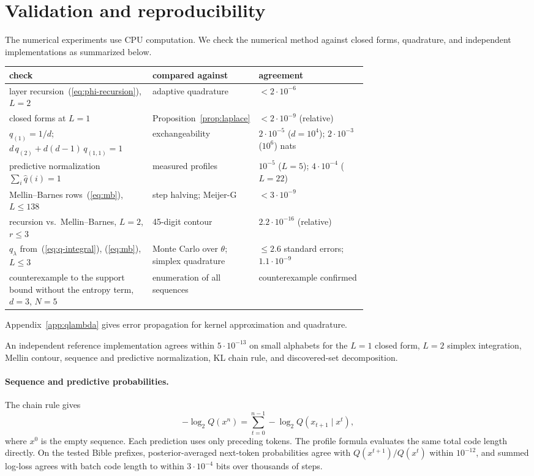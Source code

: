 \documentclass[anon]{alt2027}
\renewcommand{\eqref}[1]{(\ref{#1})}
\begin{document}
\FloatBarrier
{}
\section{Validation and reproducibility}
\label{app:validation}
The numerical experiments use CPU computation. We check the numerical method against closed forms, quadrature, and independent implementations as summarized below.
\begingroup
\renewcommand{\theHtable}{validation}
\footnotesize\setlength{\tabcolsep}{2pt} \begin{longtable}{@{}p{0.40\linewidth}p{0.28\linewidth}p{}@{}}
\toprule
check & compared against & agreement \\
\midrule
\endhead
layer recursion~\eqref{eq:phi-recursion}, $L=2$ & adaptive quadrature & $<2\cdot10^{-6}$ \\
closed forms at $L=1$ & Proposition~\ref{prop:laplace} & $<2\cdot10^{-9}$ (relative) \\
$q_{(1)}=1/d$; $d\,q_{(2)}+d(d-1)\,q_{(1,1)}=1$ & exchangeability & $2\cdot10^{-5}$ ($d{=}10^4$); $2\cdot10^{-3}$ ($10^6$) nats \\
predictive normalization $\sum_i\hat q(i)=1$ & measured profiles & $10^{-5}$ ($L=5$); $4\cdot10^{-4}$ ($L=22$) \\
Mellin--Barnes rows~\eqref{eq:mb}, $L\le138$ & step halving; Meijer-G & $<3\cdot10^{-9}$ \\
recursion vs.\ Mellin--Barnes, $L=2$, $r\le3$ & 45-digit contour & $2.2\cdot10^{-16}$ (relative) \\
$q_\lambda$ from~\eqref{eq:q-integral}, \eqref{eq:mb}, $L\le3$ & Monte Carlo over $\theta$; simplex quadrature & $\le2.6$ standard errors; $1.1\cdot10^{-9}$ \\
counterexample to the support bound without the entropy term, $d=3$, $N=5$ & enumeration of all sequences & counterexample confirmed \\
\bottomrule
\end{longtable}
\addtocounter{table}{-1}
\endgroup
Appendix~\ref{app:qlambda} gives error propagation for kernel approximation and quadrature.

An independent reference implementation agrees within $5\cdot10^{-13}$ on small alphabets for the $L=1$ closed form, $L=2$ simplex integration, Mellin contour, sequence and predictive normalization, KL chain rule, and discovered-set decomposition.

\paragraph{Sequence and predictive probabilities.} The chain rule gives \[ -\log_2Q(x^n)=\sum_{t=0}^{n-1}-\log_2Q(x_{t+1}\mid x^t), \] where $x^0$ is the empty sequence. Each prediction uses only preceding tokens. The profile formula evaluates the same total code length directly. On the tested Bible prefixes, posterior-averaged next-token probabilities agree with $Q(x^{t+1})/Q(x^t)$ within $10^{-12}$, and summed log-loss agrees with batch code length to within $3\cdot10^{-4}$ bits over thousands of steps.
\end{document}
